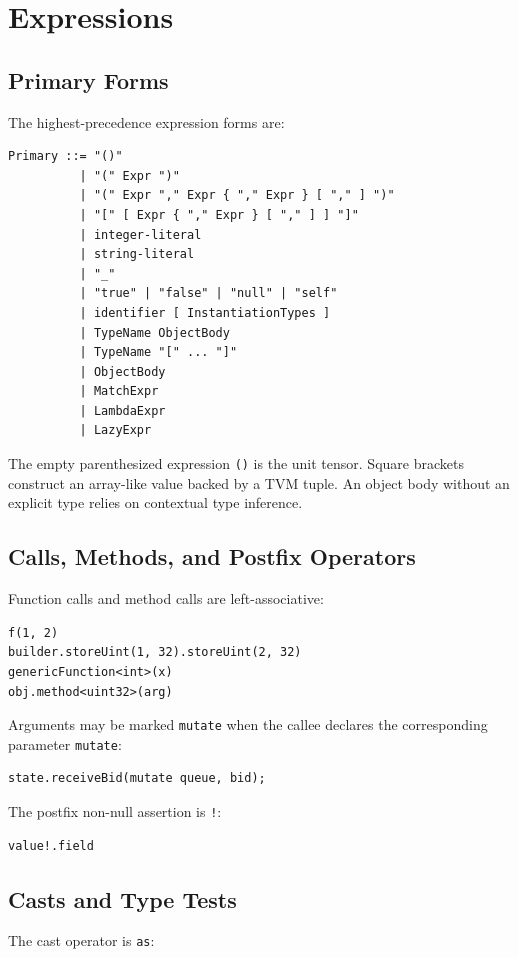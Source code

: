 \documentclass[12pt,oneside]{article}
\begin{document}
\section{Expressions}
\label{sec:expressions}
\subsection{Primary Forms}
The highest-precedence expression forms are:

\begin{verbatim}
Primary ::= "()"
          | "(" Expr ")"
          | "(" Expr "," Expr { "," Expr } [ "," ] ")"
          | "[" [ Expr { "," Expr } [ "," ] ] "]"
          | integer-literal
          | string-literal
          | "_"
          | "true" | "false" | "null" | "self"
          | identifier [ InstantiationTypes ]
          | TypeName ObjectBody
          | TypeName "[" ... "]"
          | ObjectBody
          | MatchExpr
          | LambdaExpr
          | LazyExpr
\end{verbatim}

The empty parenthesized expression \verb|()| is the unit tensor. Square
brackets construct an array-like value backed by a TVM tuple. An object body
without an explicit type relies on contextual type inference.

\subsection{Calls, Methods, and Postfix Operators}
Function calls and method calls are left-associative:

\begin{verbatim}
f(1, 2)
builder.storeUint(1, 32).storeUint(2, 32)
genericFunction<int>(x)
obj.method<uint32>(arg)
\end{verbatim}

Arguments may be marked \verb|mutate| when the callee declares the
corresponding parameter \verb|mutate|:

\begin{verbatim}
state.receiveBid(mutate queue, bid);
\end{verbatim}

The postfix non-null assertion is \verb|!|:

\begin{verbatim}
value!.field
\end{verbatim}

\subsection{Casts and Type Tests}
The cast operator is \verb|as|:
\end{document}
